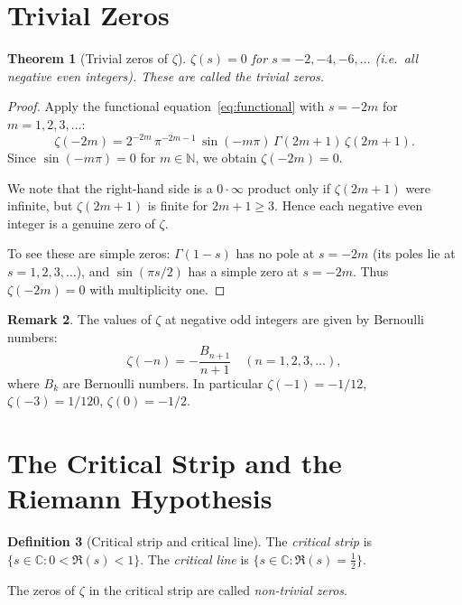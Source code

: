 \documentclass[12pt,a4paper]{amsart}
\newtheorem{theorem}{Theorem}[section]
\theoremstyle{definition}
\newtheorem{definition}[theorem]{Definition}
\newtheorem{remark}[theorem]{Remark}
\newcommand{\N}{\mathbb{N}}
\newcommand{\C}{\mathbb{C}}
\begin{document}
\section{Trivial Zeros}

\begin{theorem}[Trivial zeros of $\zeta$]
\label{thm:trivial_zeros}
$\zeta(s) = 0$ for $s = -2, -4, -6, \ldots$ (i.e.\ all negative even integers).
These are called the \emph{trivial zeros}.
\end{theorem}

\begin{proof}
Apply the functional equation~\eqref{eq:functional} with $s = -2m$ for
$m = 1, 2, 3, \ldots$:
\[
  \zeta(-2m) = 2^{-2m}\,\pi^{-2m-1}\,\sin(-m\pi)\,\Gamma(2m+1)\,\zeta(2m+1).
\]
Since $\sin(-m\pi) = 0$ for $m \in \N$, we obtain $\zeta(-2m) = 0$.

We note that the right-hand side is a $0 \cdot \infty$ product only if
$\zeta(2m+1)$ were infinite, but $\zeta(2m+1)$ is finite for $2m+1 \ge 3$.
Hence each negative even integer is a genuine zero of $\zeta$.

To see these are simple zeros: $\Gamma(1-s)$ has no pole at $s = -2m$
(its poles lie at $s = 1, 2, 3, \ldots$), and $\sin(\pi s/2)$ has
a simple zero at $s = -2m$.  Thus $\zeta(-2m) = 0$ with multiplicity one.
\end{proof}

\begin{remark}
The values of $\zeta$ at negative odd integers are given by Bernoulli numbers:
\[
  \zeta(-n) = -\frac{B_{n+1}}{n+1} \quad (n = 1, 2, 3, \ldots),
\]
where $B_k$ are Bernoulli numbers.  In particular $\zeta(-1) = -1/12$,
$\zeta(-3) = 1/120$, $\zeta(0) = -1/2$.
\end{remark}

\section{The Critical Strip and the Riemann Hypothesis}

\begin{definition}[Critical strip and critical line]
\label{def:critical_strip}
The \emph{critical strip} is $\{s \in \C : 0 < \Re(s) < 1\}$.
The \emph{critical line} is $\{s \in \C : \Re(s) = \tfrac{1}{2}\}$.

The zeros of $\zeta$ in the critical strip are called
\emph{non-trivial zeros}.
\end{definition}
\end{document}
